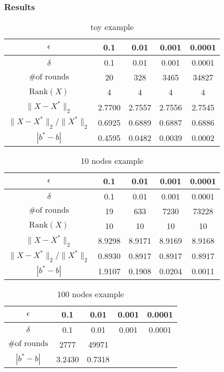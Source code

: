 \documentclass[12pt]{article}
\begin{document}
\subsubsection{Results}
\begin{table}[htbp]\label{toytable}
\centering
\begin{tabular}{||c|c|c|c|c||}
\hline
$\epsilon$ & 0.1 & 0.01 & 0.001 & 0.0001 \\
\hline
$\delta$ & 0.1 & 0.01 & 0.001 & 0.0001 \\
\hline
$\text{\# of rounds}$ & 20 & 328 & 3465  & 34827 \\
\hline
$\text{Rank} (X)$ & 4 & 4 & 4 & 4 \\
\hline
$\|X - X^*\|_2$ & 2.7700 & 2.7557 & 2.7556 & 2.7545 \\
\hline
$\|X - X^*\|_2 / \|X^*\|_2$ & 0.6925   & 0.6889 & 0.6887 & 0.6886\\
\hline
$|b^* - b|$ & 0.4595 & 0.0482 & 0.0039 & 0.0002 \\
\hline
\end{tabular}
\caption{toy example}
\end{table}

\begin{table}[htbp]\label{10nodestable}
\centering

\begin{tabular}{||c|c|c|c|c||}
\hline
$\epsilon$ & 0.1 & 0.01 & 0.001 & 0.0001 \\
\hline
$\delta$ & 0.1 & 0.01 & 0.001 & 0.0001 \\
\hline
$\text{\# of rounds}$ & 19 & 633 & 7230 & 73228 \\
\hline
$\text{Rank} (X)$ & 10 & 10 & 10 & 10 \\
\hline
$\|X - X^*\|_2$ & 8.9298 & 8.9171 & 8.9169 & 8.9168 \\
\hline
$\|X - X^*\|_2 / \|X^*\|_2$ & 0.8930 & 0.8917 & 0.8917 & 0.8917 \\
\hline
$|b^* - b|$ & 1.9107 & 0.1908 & 0.0204 & 0.0011 \\
\hline
\end{tabular}
\caption{10 nodes example}
\end{table}

\begin{table}[htbp]\label{100nodestable}
\centering
\begin{tabular}{||c|c|c|c|c||}
\hline
$\epsilon$ & 0.1 & 0.01 & 0.001 & 0.0001 \\
\hline
$\delta$ & 0.1 & 0.01 & 0.001 & 0.0001 \\
\hline
$\text{\# of rounds}$ & 2777 & 49971 &  & \\
\hline
$|b^* - b|$ & 3.2430 & 0.7318 &  & \\
\hline
\end{tabular}
\caption{100 nodes example}
\end{table}
\end{document}
